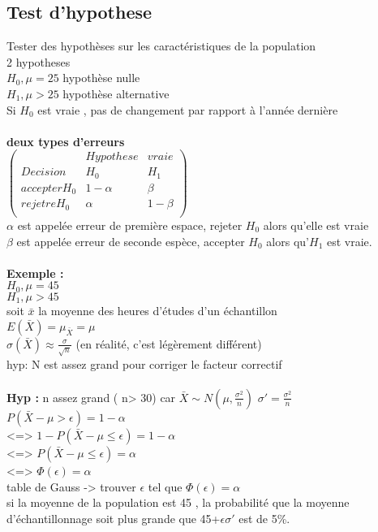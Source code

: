 \documentclass{article}
\begin{document}
\subsection{Test d'hypothese} Tester des hypothèses sur les caractéristiques de la population\\
2 hypotheses\\
$H_0, \mu =25$ hypothèse nulle\\
$H_1, \mu > 25$ hypothèse alternative\\
Si $H_0$ est vraie , pas de changement par rapport à l'année dernière\\\\
\textbf{deux types d'erreurs}\\
$\begin{pmatrix}
 & Hypothese & vraie \\
 Decision & H_0 & H_1 \\
 accepter H_0 & 1-\alpha & \beta \\
 rejetre H_0 & \alpha & 1-\beta \\
\end{pmatrix}$\\

$\alpha$ est appelée erreur de  première espace, rejeter $H_0$ alors qu'elle est vraie\\
$\beta$ est appelée erreur de seconde espèce, accepter $H_0$ alors qu'$H_1$ est vraie.\\\\

\textbf{Exemple : } \\
$H_0, \mu =45$\\
$H_1,\mu > 45$\\
soit $\bar{x}$ la moyenne des heures d'études d'un échantillon\\
$E(\bar{X}) = \mu_{\bar{X}} = \mu$\\
$\sigma(\bar{X}) \approx \frac{\sigma}{\sqrt{n}}$ (en réalité, c'est légèrement différent)\\
hyp:  N est assez grand pour corriger le facteur correctif\\\\
\textbf{Hyp : } n assez grand ( n> 30) car $\bar{X} \sim N(\mu, \frac{\sigma^2}{n})$  $\sigma' = \frac{\sigma^2}{n}$\\$P(\bar{X}- \mu > \epsilon) = 1-\alpha$ \\
 <=> $1-P(\bar{X}- \mu \leq \epsilon) = 1-\alpha$\\
 <=> $P(\bar{X}- \mu \leq \epsilon) = \alpha$\\
 <=> $\Phi(\epsilon) = \alpha$ \\
 table de Gauss -> trouver $\epsilon$ tel que $\Phi(\epsilon)=\alpha$\\
 si la moyenne de la population est 45 , la probabilité que la moyenne d'échantillonnage soit plus grande que 45+$\epsilon \sigma'$ est de 5\%.
 
\end{document}
